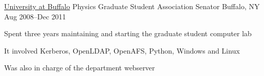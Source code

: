 


\begin{cventries}

  \cventry
    {\href{www.buffalo.edu}{University at Buffalo}}
    {Physics Graduate Student Association Senator}
    {Buffalo, NY} {Aug 2008--Dec 2011}
    {
    \begin{cvitems}
      \item Spent three years maintaining and starting the graduate student computer lab
      \item It involved Kerberos, OpenLDAP, OpenAFS, Python, Windows and Linux
      \item Was also in charge of the department webserver
    \end{cvitems}
    }


\end{cventries}


